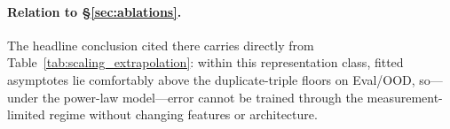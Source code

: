 

\paragraph{Relation to §\ref{sec:ablations}.}
The headline conclusion cited there carries directly from Table~\ref{tab:scaling_extrapolation}: within this representation class, fitted asymptotes lie comfortably above the duplicate-triple floors on Eval/OOD, so---under the power-law model---error cannot be trained through the measurement-limited regime without changing features or architecture.
